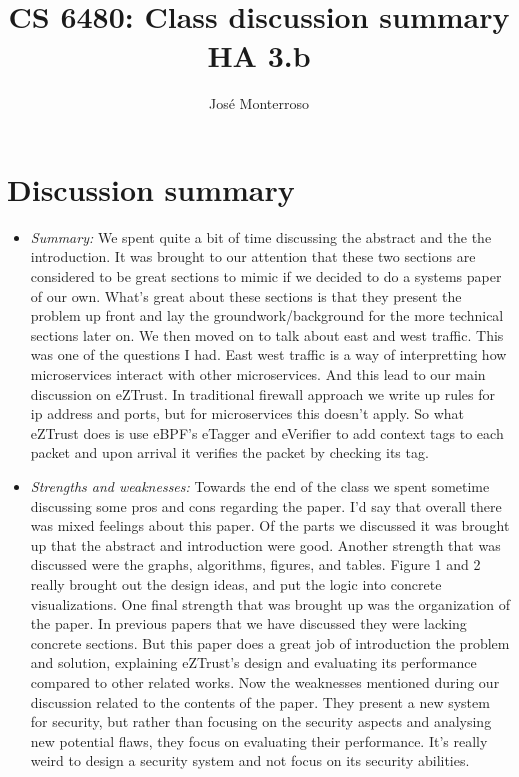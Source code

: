 \documentclass[letterpaper,twocolumn,10pt]{article}
\title{CS 6480: Class discussion summary\\
HA 3.b\\}
\author{José Monterroso}
\affil{School of Computing, University of Utah}
\begin{document}
\maketitle
\section*{Discussion summary}
\begin{itemize}

\item {\it Summary:} 
We spent quite a bit of time discussing the abstract and the the introduction. It was brought to our
attention that these two sections are considered to be great sections to mimic if we decided to do a systems
paper of our own. What's great about these sections is that they present the problem up front and lay 
the groundwork/background for the more technical sections later on. We then moved on to talk about 
east and west traffic. This was one of the questions I had. East west traffic is a way of interpretting
how microservices interact with other microservices. And this lead to our main discussion on eZTrust.
In traditional firewall approach we write up rules for ip address and ports, but for microservices this doesn't
apply. So what eZTrust does is use eBPF's eTagger and eVerifier to add context tags to each packet 
and upon arrival it verifies the packet by checking its tag. 


\item {\it Strengths and weaknesses:} 
Towards the end of the class we spent sometime discussing some pros and cons regarding the paper. I'd 
say that overall there was mixed feelings about this paper. Of the parts we discussed it was brought up that 
the abstract and introduction were good. Another strength that was discussed were the graphs, algorithms, 
figures, and tables. Figure 1 and 2
really brought out the design ideas, and put the logic into concrete visualizations. One final strength that was brought up 
was the organization of the paper. In previous papers that we have discussed they were lacking concrete sections.
But this paper does a great job of introduction the problem and solution, explaining eZTrust's design and evaluating
its performance compared to other related works.  Now the weaknesses mentioned during our discussion related
to the contents of the paper. They present a new system for security, but rather than focusing on the security aspects
and analysing new potential flaws, they focus on evaluating their performance. It's really weird to design a security 
system and not focus on its security abilities. 


\end{itemize}
\end{document}
